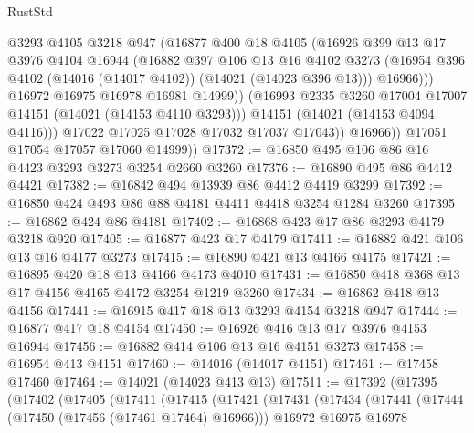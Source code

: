 \begin{lexlean}{RustStd}
\begin{coremodule}
                      @3293
                      @4105
                      @3218
                      @947
                      (@16877
                        @400
                        @18
                        @4105
                        (@16926
                          @399
                          @13
                          @17
                          @3976
                          @4104
                          @16944
                          (@16882
                            @397
                            @106
                            @13
                            @16
                            @4102
                            @3273
                            (@16954 @396 @4102 (@14016 (@14017 @4102)) (@14021 (@14023 @396 @13)))
                            @16966)))
                      @16972
                      @16975
                      @16978
                      @16981
                      @14999))
                  (@16993 @2335 @3260 @17004 @17007 @14151 (@14021 (@14153 @4110 @3293)))
                  @14151
                  (@14021 (@14153 @4094 @4116)))
                @17022
                @17025
                @17028
                @17032
                @17037
                @17043))
            @16966))
        @17051
        @17054
        @17057
        @17060
        @14999))
@17372 := @16850 @495 @106 @86 @16 @4423 @3293 @3273 @3254 @2660 @3260
@17376 := @16890 @495 @86 @4412 @4421
@17382 := @16842 @494 @13939 @86 @4412 @4419 @3299
@17392 := @16850 @424 @493 @86 @88 @4181 @4411 @4418 @3254 @1284 @3260
@17395 := @16862 @424 @86 @4181
@17402 := @16868 @423 @17 @86 @3293 @4179 @3218 @920
@17405 := @16877 @423 @17 @4179
@17411 := @16882 @421 @106 @13 @16 @4177 @3273
@17415 := @16890 @421 @13 @4166 @4175
@17421 := @16895 @420 @18 @13 @4166 @4173 @4010
@17431 := @16850 @418 @368 @13 @17 @4156 @4165 @4172 @3254 @1219 @3260
@17434 := @16862 @418 @13 @4156
@17441 := @16915 @417 @18 @13 @3293 @4154 @3218 @947
@17444 := @16877 @417 @18 @4154
@17450 := @16926 @416 @13 @17 @3976 @4153 @16944
@17456 := @16882 @414 @106 @13 @16 @4151 @3273
@17458 := @16954 @413 @4151
@17460 := @14016 (@14017 @4151)
@17461 := @17458 @17460
@17464 := @14021 (@14023 @413 @13)
@17511 := @17392
    (@17395
      (@17402
        (@17405
          (@17411
            (@17415
              (@17421
                (@17431
                  (@17434
                    (@17441
                      (@17444 (@17450 (@17456 (@17461 @17464) @16966)))
                      @16972
                      @16975
                      @16978

\end{coremodule}
\end{lexlean}
